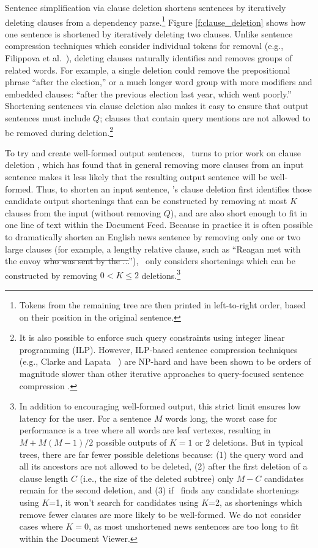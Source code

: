 Sentence simplification via {clause deletion} shortens sentences by iteratively deleting clauses from a dependency parse.\footnote{Tokens from the remaining tree are then printed in left-to-right order, based on their position in the original sentence.}
Figure \ref{f:clause_deletion} shows how one sentence is shortened by iteratively deleting two clauses.
Unlike sentence compression techniques which consider individual tokens for removal (e.g., Filippova et al.\ \cite{filippova2015sentence}), deleting clauses naturally identifies and removes groups of related words.
For example, a single deletion could remove the prepositional phrase ``after the election,'' or a much longer word group with more modifiers and embedded clauses: ``after the previous election last year, which went poorly.''
Shortening sentences via clause deletion also makes it easy to ensure that output sentences must include $Q$; clauses that contain query mentions are not allowed to be removed during deletion.\footnote{
It is also possible to enforce such query constraints using integer linear programming (ILP). 
However, ILP-based sentence compression techniques (e.g., Clarke and Lapata \ \cite{clarke2008}) are NP-hard and have been shown to be orders of magnitude slower than other iterative approaches to query-focused sentence compression \cite{Handler2019Query}.
}



To try and create well-formed output sentences, \ours~turns to prior work on clause deletion \cite[Section 6]{Handler2019HumanAJ}, which has found that in general removing more clauses from an input sentence makes it less likely that the resulting output sentence will be well-formed.
Thus, to shorten an input sentence, \ours's clause deletion first identifies those candidate output shortenings that can be constructed by removing at most $K$ clauses from the input (without removing $Q$), and are also short enough to fit in one line of text within the Document Feed.
Because in practice it is often possible to dramatically shorten an English news sentence by removing only one or two large clauses (for example, a lengthy relative clause, such as ``Reagan met with the envoy \sout{who was sent by the ...}''), \ours~only considers shortenings which can be constructed by removing 
$0 < K \leq 2$ deletions.\footnote{
In addition to encouraging well-formed output, this strict limit ensures low latency for the user.
For a sentence $M$ words long, the worst case for performance is a tree where all words are leaf vertexes, resulting in $M+M(M-1)/2$ possible outputs of $K=1$ or $2$ deletions.
But in typical trees, there are far fewer possible deletions because: (1) the query word and all its ancestors are not allowed to be deleted, (2) after the first deletion of a clause length $C$ (i.e., the size of the deleted subtree) only $M-C$ candidates remain for the second deletion, and (3) if \ours~finds any candidate shortenings using $K$=1, it won't search for candidates using $K$=2, as shortenings which remove fewer clauses are more likely to be well-formed.
We do not consider cases where $K=0$, as most unshortened news sentences are too long to fit within the Document Viewer.}

